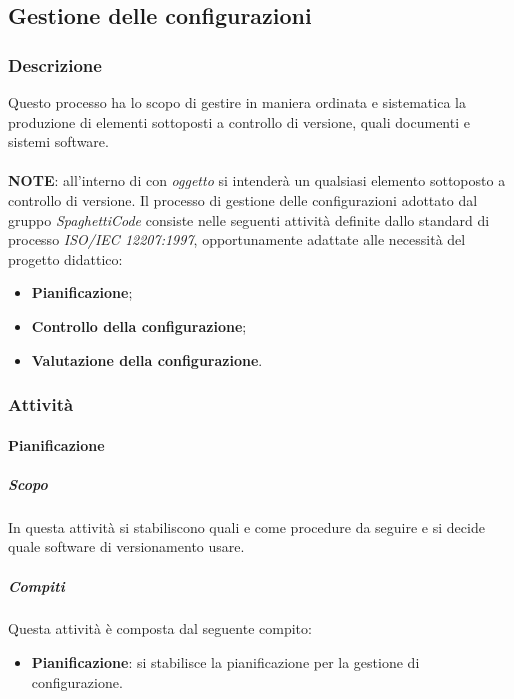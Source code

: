 \subsection{Gestione delle configurazioni}
\label{sub:gestione_configurazioni}

\subsubsection{Descrizione}
\label{ssub:gestione_configurazione:descrizione}

Questo processo ha lo scopo di gestire in maniera ordinata e sistematica la produzione di elementi sottoposti a controllo di versione,
quali documenti e sistemi software.
\\
\\
\textbf{NOTE}: all'interno di  con \emph{oggetto} si intenderà un qualsiasi elemento sottoposto a
controllo di versione.
\label{par:gestione_configurazione:compiti}
Il processo di gestione delle configurazioni adottato dal gruppo \emph{SpaghettiCode} consiste nelle seguenti attività definite dallo standard di processo \emph{ISO/IEC 12207:1997}, opportunamente adattate alle necessità del progetto didattico:
\begin{itemize}
    \item \textbf{Pianificazione};
    \item \textbf{Controllo della configurazione};
    \item \textbf{Valutazione della configurazione}.
\end{itemize}

\subsubsection{Attività}

\paragraph{Pianificazione}
\label{par:pianificazione}
\subparagraph{Scopo}
\label{par:pianificazione:scopo}
In questa attività si stabiliscono quali e come procedure da seguire e si decide quale software di versionamento usare.
\subparagraph{Compiti}
\label{par:pianificazione:compiti}
Questa attività è composta dal seguente compito:
\begin{itemize}
    \item \textbf{Pianificazione}: si stabilisce la pianificazione per la gestione di configurazione.
\end{itemize}

